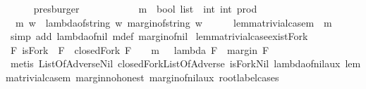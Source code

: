 \begin{isabellebody}
\ \ \ \ \isamarkupfalse%
\ presburger\ \isanewline
{}\isamarkupfalse%
%
\endisatagproof
{\isafoldproof}%
%
\isadelimproof
\ \ \ \ \ \ \isanewline
%
\endisadelimproof
\ \ \isanewline
{}\isamarkupfalse%
\ m\ {\isacharcolon}{\isacharcolon}\ {\isachardoublequoteopen}bool\ list\ {\isasymRightarrow}\ {\isacharparenleft}int{\isacharcomma}\ int{\isacharparenright}\ prod{\isachardoublequoteclose}\ \isanewline
\ \ {\isachardoublequoteopen}m\ w\ {\isacharequal}\ {\isacharparenleft}lambda{\isacharunderscore}of{\isacharunderscore}string\ w{\isacharcomma}\ margin{\isacharunderscore}of{\isacharunderscore}string\ w{\isacharparenright}{\isachardoublequoteclose}\isanewline
\ \ \ \ \isanewline
{}\isamarkupfalse%
\ lemma{\isacharunderscore}{}{\isacharunderscore}{}{}{\isacharunderscore}trivial{\isacharunderscore}case{\isacharunderscore}m\ {\isacharcolon}\ {\isachardoublequoteopen}m\ {\isacharbrackleft}{\isacharbrackright}\ {\isacharequal}\ {\isacharparenleft}{}{\isacharcomma}{}{\isacharparenright}{\isachardoublequoteclose}\isanewline
%
\isadelimproof
\ \ %
\endisadelimproof
%
\isatagproof
{}\isamarkupfalse%
\ {\isacharparenleft}simp\ add{\isacharcolon}\ lambda{\isacharunderscore}of{\isacharunderscore}nil\ m{\isacharunderscore}def\ margin{\isacharunderscore}of{\isacharunderscore}nil{\isacharparenright}%
\endisatagproof
{\isafoldproof}%
%
\isadelimproof
\isanewline
%
\endisadelimproof
\isanewline
{}\isamarkupfalse%
\ lemma{\isacharunderscore}{}{\isacharunderscore}{}{}{\isacharunderscore}trivial{\isacharunderscore}case{\isacharunderscore}exist{\isacharunderscore}Fork\ {\isacharcolon}\ \isanewline
{\isachardoublequoteopen}{\isasymexists}\ F{\isachardot}\ {\isacharparenleft}isFork\ {\isacharbrackleft}{\isacharbrackright}\ F\ {\isasymand}\ closedFork\ F\ {\isacharbrackleft}{\isacharbrackright}\ \ {\isasymand}\ {\isacharparenleft}m\ {\isacharbrackleft}{\isacharbrackright}\ {\isacharequal}\ {\isacharparenleft}lambda\ F\ {\isacharbrackleft}{\isacharbrackright}{\isacharcomma}\ margin\ F\ {\isacharbrackleft}{\isacharbrackright}{\isacharparenright}{\isacharparenright}{\isacharparenright}{\isachardoublequoteclose}\isanewline
%
\isadelimproof
\ \ %
\endisadelimproof
%
\isatagproof
{}\isamarkupfalse%
\ {\isacharparenleft}metis\ ListOfAdverse{\isachardot}Nil\ closedFork{\isacharunderscore}ListOfAdverse\ isFork{\isacharunderscore}Nil\ lambda{\isacharunderscore}of{\isacharunderscore}nil{\isacharunderscore}aux\ lemma{\isacharunderscore}{}{\isacharunderscore}{}{}{\isacharunderscore}trivial{\isacharunderscore}case{\isacharunderscore}m\ margin{\isacharunderscore}no{\isacharunderscore}honest\ margin{\isacharunderscore}of{\isacharunderscore}nil{\isacharunderscore}aux\ root{\isacharunderscore}label{\isacharunderscore}{}{\isachardot}cases{\isacharparenright}%

\end{isabellebody}
